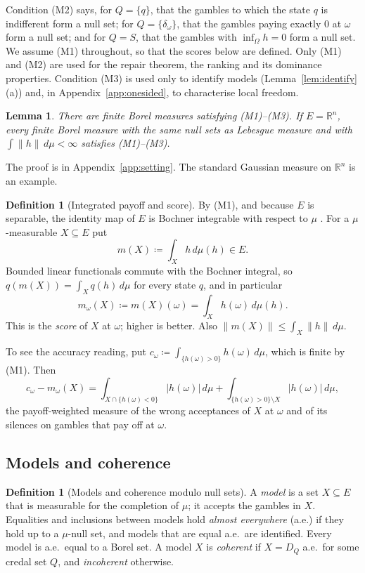 \documentclass[11pt]{article}
\newcommand{\R}{\mathbb{R}}
\theoremstyle{plain}
\newtheorem{lemma}[theorem]{Lemma}
\theoremstyle{definition}
\newtheorem{definition}[theorem]{Definition}
\theoremstyle{remark}
\begin{document}
Condition (M2) says, for $Q=\{q\}$, that the gambles to which the state $q$ is indifferent
form a null set; for $Q=\{\delta_\omega\}$, that the gambles paying exactly $0$ at $\omega$
form a null set; and for $Q=S$, that the gambles with $\inf_\Omega h=0$ form a null set.
We assume (M1) throughout, so that the scores below are defined. Only (M1) and (M2) are
used for the repair theorem, the ranking and its dominance properties.
Condition (M3) is used only to identify models (Lemma~\ref{lem:identify}(a)) and, in
Appendix~\ref{app:onesided}, to characterise local freedom.

\begin{lemma}\label{lem:measure}
There are finite Borel measures satisfying (M1)--(M3). If $E=\R^n$, every finite Borel
measure with the same null sets as Lebesgue measure and with $\int\|h\|\,d\mu<\infty$
satisfies (M1)--(M3).
\end{lemma}

The proof is in Appendix~\ref{app:setting}. The standard Gaussian measure on $\R^n$ is an
example.

\begin{definition}[Integrated payoff and score]\label{def:score}
By (M1), and because $E$ is separable, the identity map of $E$ is Bochner integrable with
respect to $\mu$ \cite{DiestelUhl}. For a $\mu$-measurable $X\subseteq E$ put
\[
  m(X)\coloneqq\int_Xh\,d\mu(h)\in E .
\]
Bounded linear functionals commute with the Bochner integral, so $q(m(X))=\int_Xq(h)\,d\mu$
for every state $q$, and in particular
\[
  m_\omega(X)\coloneqq m(X)(\omega)=\int_Xh(\omega)\,d\mu(h).
\]
This is the \emph{score} of $X$ at $\omega$; higher is better. Also $\|m(X)\|\le\int_X\|h\|
\,d\mu$.
\end{definition}

To see the accuracy reading, put $c_\omega\coloneqq\int_{\{h(\omega)>0\}}h(\omega)
\,d\mu$, which is finite by (M1). Then
\[
  c_\omega-m_\omega(X)=\int_{X\cap\{h(\omega)<0\}}|h(\omega)|\,d\mu+\int_{\{h(\omega)>0\}
  \setminus X}|h(\omega)|\,d\mu ,
\]
the payoff-weighted measure of the wrong acceptances of $X$ at $\omega$ and of its silences
on gambles that pay off at $\omega$.

\subsection{Models and coherence}

\begin{definition}[Models and coherence modulo null sets]\label{def:models}
A \emph{model} is a set $X\subseteq E$ that is measurable for the completion of $\mu$; it
accepts the gambles in $X$. Equalities and inclusions between models hold \emph{almost
everywhere} (a.e.) if they hold up to a $\mu$-null set, and models that are equal a.e.\ are
identified. Every model is a.e.\ equal to a Borel set. A model $X$ is \emph{coherent} if
$X=D_Q$ a.e.\ for some credal set $Q$, and \emph{incoherent} otherwise.
\end{definition}
\end{document}
